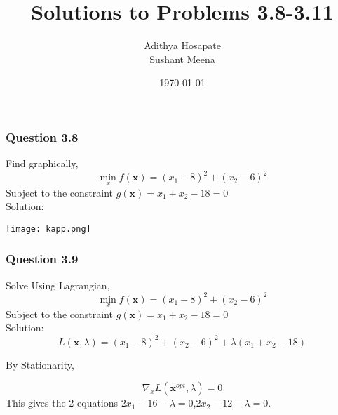 \documentclass{beamer}
\title[3.8-3.11]{Solutions to  Problems 3.8-3.11} %
\author{Adithya Hosapate \\ Sushant Meena} %
\institute[IITH] %
{
IIT Hyderabad \\ %
\medskip
\textit{ee16btech11040@iith.ac.in} %
\medskip \\
\textit{es16btech11021@iith.ac.in}
}
\date{\today} %
\begin{document}
\begin{frame}
\titlepage %
\end{frame}






\begin{frame}
\frametitle{Question 3.8}
Find graphically,
\begin{equation*}
    \min_{x} f(\textbf{x}) =(x_1-8)^2+(x_2-6)^2 
\end{equation*}
Subject to the constraint $g(\textbf{x})=x_1+x_2-18=0$\\
Solution:\\
\begin{center}
   \texttt{[image: kapp.png]}
 
\end{center}

\end{frame}





\begin{frame}
\frametitle{Question 3.9}
Solve Using Lagrangian,
\begin{equation*}
    \min_{x} f(\textbf{x}) =(x_1-8)^2+(x_2-6)^2 
\end{equation*}
Subject to the constraint $ g( \textbf{x} )=x_1+x_2-18=0 $\\
Solution:\\
\begin{equation*}
   L(\textbf{x},\lambda)=(x_1-8)^2+(x_2-6)^2 + \lambda(x_1+x_2-18)
\end{equation*}

By Stationarity,

\begin{equation*}
   \nabla_{x} L( \textbf{x}^{opt} , \lambda )=0
\end{equation*}
This gives the 2 equations $2x_1 - 16 - \lambda =0$,$2x_2 - 12 - \lambda=0$.





\end{frame}
\end{document}
